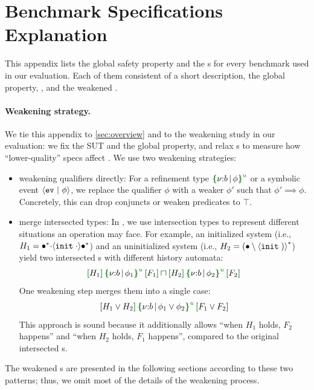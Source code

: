 \newpage
\section{Benchmark Specifications Explanation}\label{sec:tech:bench-explain}

\newcommand{\SNegStar}[1]{{\bigl(\compA{#1}\bigr)^{\ast}}}
\newcommand{\SNegStarU}[2]{{\bigl(\anyA \setminus ({#1} \cup {#2})\bigr)^{\ast}}}
\newcommand{\SNegStarUU}[3]{{\bigl(\anyA \setminus ({#1} \cup {#2} \cup {#3})\bigr)^{\ast}}}
\newcommand{\SNegStarUUU}[4]{{\bigl(\anyA \setminus ({#1} \cup {#2} \cup {#3} \cup {#4})\bigr)^{\ast}}}
\newcommand{\SNegStarTri}[3]{{\bigl(\anyA \setminus ({#1} \cup {#2} \cup {#3})\bigr)^{\ast}}}
\newcommand{\SNegStarExcl}[1]{{\bigl(\anyA \setminus ({#1})\bigr)^{\ast}}}

This appendix lists the global safety property and the \tyName{}s for every benchmark used in our evaluation. Each of them consistent of a short description, the global property, \tyName{}, and the weakened \tyName{}.

\paragraph{Weakening strategy.}
We tie this appendix to \autoref{sec:overview} and to the weakening study in our evaluation: we fix the SUT and the global property, and relax \tyName{}s to measure how ``lower-quality'' specs affect \name{}. We use two weakening strategies:
\begin{itemize}
  \item weakening qualifiers directly: For a refinement type $\urt{b}{\phi}$ or a symbolic event ${\langle} {\boldsymbol{{\tt ev}}~|~{\phi}} {\rangle}$, we replace the qualifier $\phi$ with a weaker $\phi'$ such that $\phi' \implies \phi$. Concretely, this can drop conjuncts or weaken predicates to $\top$.
  \item merge intersected types: In \tyName{}, we use intersection types to represent different situations an operation may face. For example, an initialized system (i.e., $H_1 = {\bullet^*} {\cdot} {\langle} {\boldsymbol{{\tt init}}\;{{\cdot}}} {\rangle} {\bullet^*}$) and an uninitialized system (i.e., $H_2 = (\bullet \setminus {\langle} {\boldsymbol{{\tt init}}\;{)}} {\rangle}^*$) yield two intersected \tyName{}s with different history automata:
  \begin{align*}
    \uhat{H_1}{\urt{b}{\phi_1}}{F_1} \interty \uhat{H_2}{\urt{b}{\phi_2}}{F_2}
  \end{align*}\noindent
  One weakening step merges them into a single case:
  \begin{align*}
    \uhat{H_1 \lorA H_2}{\urt{b}{\phi_1 \lor \phi_2}}{F_1 \lorA F_2}
  \end{align*}\noindent
  This approach is sound because it additionally allows ``when $H_1$ holds, $F_2$ happens'' and ``when $H_2$ holds, $F_1$ happens'', compared to the original intersected \tyName{}s.
\end{itemize}
The weakened \tyName{}s are presented in the following sections according to these two patterns; thus, we omit most of the details of the weakening process.

